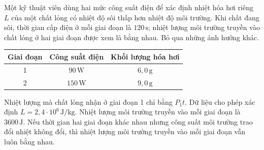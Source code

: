 \begin{ex_test}
Một kỹ thuật viên dùng hai mức công suất điện để xác định nhiệt hóa hơi riêng $L$ của một chất lỏng có nhiệt độ sôi thấp hơn nhiệt độ môi trường. Khi chất đang sôi, thời gian cấp điện ở mỗi giai đoạn là $120\,\mathrm{s}$; nhiệt lượng môi trường truyền vào chất lỏng ở hai giai đoạn được xem là bằng nhau. Bỏ qua những ảnh hưởng khác.

\begin{center}
\begin{tabular}{|c|c|c|}\hline
Giai đoạn & Công suất điện & Khối lượng hóa hơi \\ \hline
1 & $90\,\mathrm{W}$ & $6{,}0\,\mathrm{g}$ \\ \hline
2 & $150\,\mathrm{W}$ & $9{,}0\,\mathrm{g}$ \\ \hline
\end{tabular}
\end{center}
\choiceTF
{Nhiệt lượng mà chất lỏng nhận ở giai đoạn 1 chỉ bằng $P_1t$.}
{\True Dữ liệu cho phép xác định $L=2{,}4\cdot10^6\,\mathrm{J/kg}$.}
{\True Nhiệt lượng môi trường truyền vào mỗi giai đoạn là $3600\,\mathrm{J}$.}
{Nếu thời gian hai giai đoạn khác nhau nhưng công suất môi trường trao đổi nhiệt không đổi, thì nhiệt lượng môi trường truyền vào mỗi giai đoạn vẫn luôn bằng nhau.}
\end{ex_test}